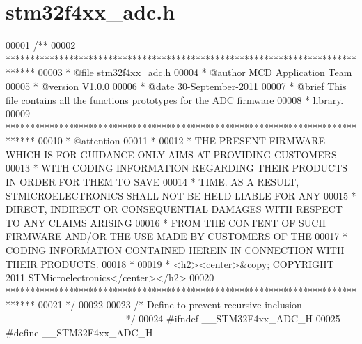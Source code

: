 \section{stm32f4xx\+\_\+adc.\+h}
\label{stm32f4xx__adc_8h_source}

\begin{DoxyCode}
00001 \textcolor{comment}{/**}
00002 \textcolor{comment}{  ******************************************************************************}
00003 \textcolor{comment}{  * @file    stm32f4xx\_adc.h}
00004 \textcolor{comment}{  * @author  MCD Application Team}
00005 \textcolor{comment}{  * @version V1.0.0}
00006 \textcolor{comment}{  * @date    30-September-2011}
00007 \textcolor{comment}{  * @brief   This file contains all the functions prototypes for the ADC firmware }
00008 \textcolor{comment}{  *          library.}
00009 \textcolor{comment}{  ******************************************************************************}
00010 \textcolor{comment}{  * @attention}
00011 \textcolor{comment}{  *}
00012 \textcolor{comment}{  * THE PRESENT FIRMWARE WHICH IS FOR GUIDANCE ONLY AIMS AT PROVIDING CUSTOMERS}
00013 \textcolor{comment}{  * WITH CODING INFORMATION REGARDING THEIR PRODUCTS IN ORDER FOR THEM TO SAVE}
00014 \textcolor{comment}{  * TIME. AS A RESULT, STMICROELECTRONICS SHALL NOT BE HELD LIABLE FOR ANY}
00015 \textcolor{comment}{  * DIRECT, INDIRECT OR CONSEQUENTIAL DAMAGES WITH RESPECT TO ANY CLAIMS ARISING}
00016 \textcolor{comment}{  * FROM THE CONTENT OF SUCH FIRMWARE AND/OR THE USE MADE BY CUSTOMERS OF THE}
00017 \textcolor{comment}{  * CODING INFORMATION CONTAINED HEREIN IN CONNECTION WITH THEIR PRODUCTS.}
00018 \textcolor{comment}{  *}
00019 \textcolor{comment}{  * <h2><center>&copy; COPYRIGHT 2011 STMicroelectronics</center></h2>}
00020 \textcolor{comment}{  ******************************************************************************}
00021 \textcolor{comment}{  */}
00022 
00023 \textcolor{comment}{/* Define to prevent recursive inclusion -------------------------------------*/}
00024 \textcolor{preprocessor}{#}\textcolor{preprocessor}{ifndef} \textcolor{preprocessor}{\_\_STM32F4xx\_ADC\_H}
00025 \textcolor{preprocessor}{#}\textcolor{preprocessor}{define} \textcolor{preprocessor}{\_\_STM32F4xx\_ADC\_H}

\end{DoxyCode}
